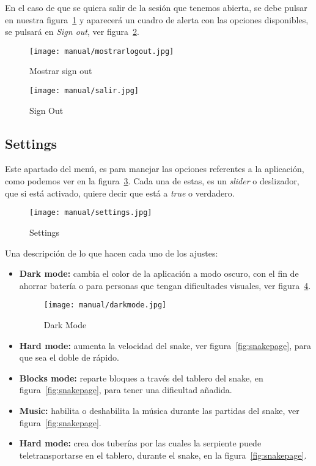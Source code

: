 En el caso de que se quiera salir de la sesión que tenemos abierta, se debe pulsar en nuestra figura~\ref{fig:mostrarlogout} y aparecerá un cuadro de alerta con las opciones disponibles, se pulsará en \emph{Sign out}, ver figura~\ref{fig:salir}.

\begin{figure}[H]
	\centering
	\texttt{[image: manual/mostrarlogout.jpg]}
	\caption{Mostrar sign out}\label{fig:mostrarlogout}
\end{figure}

\begin{figure}[H]
	\centering
	\texttt{[image: manual/salir.jpg]}
	\caption{Sign Out}\label{fig:salir}
\end{figure}

\subsection{Settings}\label{settings}
Este apartado del menú, es para manejar las opciones referentes a la aplicación, como podemos ver en la figura~\ref{fig:settingspage}. Cada una de estas, es un \emph{slider} o deslizador, que si está activado, quiere decir que está a \emph{true} o verdadero.

\begin{figure}[H]
	\centering
	\texttt{[image: manual/settings.jpg]}
	\caption{Settings}\label{fig:settingspage}
\end{figure}

Una descripción de lo que hacen cada uno de los ajustes:

\begin{itemize}
	\item \textbf{Dark mode:} cambia el color de la aplicación a modo oscuro, con el fin de ahorrar batería o para personas que tengan dificultades visuales, ver figura~\ref{fig:darkmode}.
	\begin{figure}[H]
		\centering
		\texttt{[image: manual/darkmode.jpg]}
		\caption{Dark Mode}\label{fig:darkmode}
	\end{figure}
	\item \textbf{Hard mode:} aumenta la velocidad del snake, ver figura~\ref{fig:snakepage}, para que sea el doble de rápido.
	\item \textbf{Blocks mode:} reparte bloques a través del tablero del snake, en figura~\ref{fig:snakepage}, para tener una dificultad añadida.
	\item \textbf{Music:} habilita o deshabilita la música durante las partidas del snake, ver figura~\ref{fig:snakepage}.
	\item \textbf{Hard mode:} crea dos tuberías por las cuales la serpiente puede teletransportarse en el tablero, durante el  snake, en la figura~\ref{fig:snakepage}.
\end{itemize}

